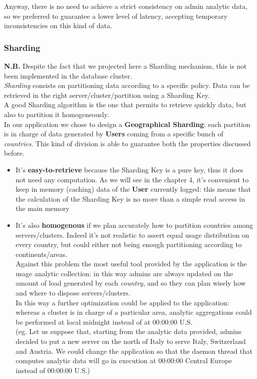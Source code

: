 Anyway, there is no need to achieve a strict consistency on admin analytic data, so we preferred to guarantee a lower level of latency, accepting temporary inconsistencies on this kind of data.
\subsubsection{Sharding}
\textbf{N.B.} Despite the fact that we projected here a Sharding mechanism, this is not been implemented in the database cluster. \medskip \\
\textit{Sharding} consists on partitioning data according to a specific policy. Data can be retrieved in the right server/cluster/partition using a Sharding Key.\\
A good Sharding algorithm is the one that permits to retrieve quickly data, but also to partition it homogeneously.\\
In our application we chose to design a \textbf{Geographical Sharding}: each partition is in charge of data generated by \textbf{Users} coming from a specific bunch of \textit{countries}. This kind of division is able to guarantee both the properties discussed before.
\begin{itemize}
	\item It’s \textbf{easy-to-retrieve} because the Sharding Key is a pure key, thus it does not need any computation. As we will see in the chapter 4, it’s convenient to keep in memory (caching) data of the \textbf{User} currently logged: this means that the calculation of the Sharding Key is no more than a simple read access in the main memory
	\item It’s also \textbf{homogenous} if we plan accurately how to partition countries among servers/clusters. Indeed it’s not realistic to assert equal usage distribution on every country, but could either not being enough partitioning according to continents/areas.\\
	Against this problem the most useful tool provided by the application is the usage analytic collection: in this way admins are always updated on the amount of load generated by each \textit{country}, and so they can plan wisely how and where to dispose servers/clusters.\\
	In this way a further optimization could be applied to the application: whereas a cluster is in charge of a particular area, analytic aggregations could be performed  at local midnight instead of at 00:00:00 U.S.\\
	(eg. Let us suppose that, starting from the analytic data provided, admins decided to put a new server on the north of Italy to serve Italy, Switzerland and Austria. We could change the application so that the daemon thread that computes analytic data will go in execution at 00:00:00 Central Europe instead of 00:00:00 U.S.)
\end{itemize}
